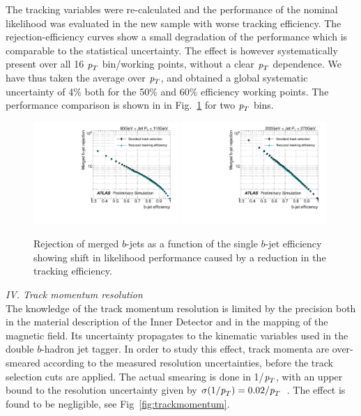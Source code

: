 The tracking variables were re-calculated and the performance of the nominal likelihood was evaluated in the new sample with worse tracking efficiency. The rejection-efficiency curves %
 show a small degradation of the performance which is comparable to the statistical uncertainty. The effect is however systematically present over all 16 ${\emph{p}_{T}}$ bin/working points, without a clear ${\emph{p}_{T}}$ dependence. We have thus taken the average over ${\emph{p}_{T}}$, and obtained a global systematic uncertainty of 4\% both for the 50\% and 60\% efficiency working points. The performance comparison is shown in in Fig.~\ref{fig:trackefficiency} for two ${\emph{p}_{T}}$ bins. %

\begin{figure}[tp]
\centering
\includegraphics[width=0.49\textwidth]{FIGS/systematics/LlhoodKDE_ISO_TrackingUncertaintyTest_rejvseff080.pdf}
\includegraphics[width=0.49\textwidth]{FIGS/systematics/LlhoodKDE_ISO_TrackingUncertaintyTest_rejvseff200.pdf}
\caption{Rejection of merged $b$-jets as a function of the single $b$-jet efficiency showing shift in likelihood performance caused by a reduction in the tracking efficiency.}
\label{fig:trackefficiency}
\end{figure}

\vspace{3mm}
{\em IV. Track momentum resolution}
\\[3mm]
The knowledge of the track momentum resolution is limited by the precision both in the material description of the Inner Detector and in the mapping of the magnetic field. Its uncertainty propagates to the kinematic variables used in the double $b$-hadron jet tagger. In order to study this effect, track momenta are over-smeared according to the measured resolution uncertainties, before the track selection cuts are applied.  %
The actual smearing is done in 1/${\emph{p}_{T}}$, with an upper bound to the resolution uncertainty given by $\sigma(1/{\emph{p}_{T}})=0.02/{\emph{p}_{T}}$~\cite{ATLAS-CONF-2010-009}. The effect is found to be negligible, see Fig~\ref{fig:trackmomentum}. %

